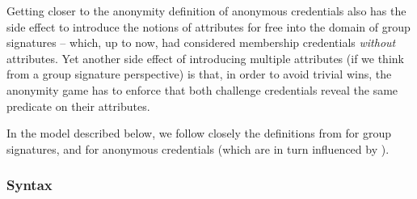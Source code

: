 Getting closer to the anonymity definition of anonymous credentials also has the
side effect to introduce the notions of attributes for free into the domain of
group signatures -- which, up to now, had considered membership credentials
\emph{without} attributes. Yet another side effect of introducing multiple
attributes (if we think from a group signature perspective) is that, in order
to avoid trivial wins, the anonymity game has to enforce that both challenge
credentials reveal the same predicate on their attributes.

In the model described below, we follow closely the definitions from
\cite{bsz05} for group signatures, and \cite{fhs19} for anonymous credentials
(which are in turn influenced by \cite{bsz05}).

\subsubsection{Syntax}
\label{sssec:syntax-gsac}

